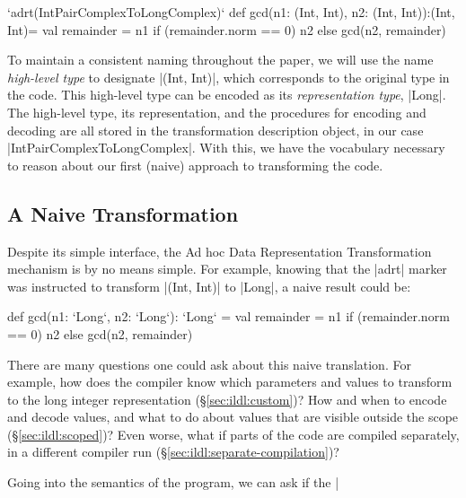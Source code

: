 \begin{lstlisting-nobreak}
`adrt(IntPairComplexToLongComplex)` {
 def gcd(n1: (Int, Int), n2: (Int, Int)):(Int, Int)={
   val remainder = n1 %
   if (remainder.norm == 0) n2 else gcd(n2, remainder)
 }
}
\end{lstlisting-nobreak}

To maintain a consistent naming throughout the paper, we will
use the name \emph{high-level type} to designate |(Int, Int)|, which
corresponds to the original type in the code. This high-level type can
be encoded as its \emph{representation type}, |Long|. The high-level
type, its representation, and the procedures for encoding and decoding
are all stored in the transformation description object, in our case
|IntPairComplexToLongComplex|. With this, we have the vocabulary
necessary to reason about our first (naive) approach to transforming
the code.

\subsection{A Naive Transformation}

Despite its simple interface, the Ad hoc Data Representation Transformation mechanism is by no means simple. For example, knowing that the |adrt| marker was instructed to transform |(Int, Int)| to |Long|, a naive result could be:

\begin{lstlisting-nobreak}
def gcd(n1: `Long`, n2: `Long`): `Long` = {
  val remainder = n1 %
  if (remainder.norm == 0) n2 else gcd(n2, remainder)
}
\end{lstlisting-nobreak}

There are many questions one could ask about this naive translation. For example, how does the compiler know which parameters and values to transform to the long integer representation (\S\ref{sec:ildl:custom})? How and when to encode and decode values, and what to do about values that are visible outside the scope (\S\ref{sec:ildl:scoped})? Even worse, what if parts of the code are compiled separately, in a different compiler run (\S\ref{sec:ildl:separate-compilation})?

Going into the semantics of the program, we can ask if the |%

